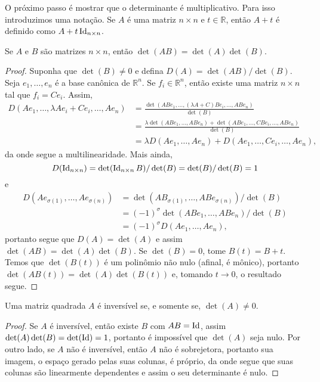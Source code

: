 O próximo passo é mostrar que o determinante é multiplicativo. Para isso introduzimos uma notação. Se $A$ é uma matriz $n \times n$ e $t \in \mathbb{R}$, então $A + t$ é definido como $A + t\operatorname{Id}_{n \times n}$.

\begin{theorem}
    Se $A$ e $B$ são matrizes $n \times n$, então $\det(AB) = \det(A)\det(B)$.
\end{theorem}
\begin{proof}
    Suponha que $\det(B) \neq 0$ e defina $D(A) = \det(AB)/\det(B)$. Seja $e_1, \dots, e_n$ é a base canônica de $\mathbb{R}^n$. Se $f_i \in \mathbb{R}^n$, então existe uma matriz $n \times n$ tal que $f_i = Ce_i$. Assim, \begin{align}
        D(Ae_1, \dots, \lambda Ae_i + Ce_i, \dots, Ae_n) &= \frac{\det(ABe_1, \dots, (\lambda A+C)Be_i, \dots, ABe_n)}{\det(B)} \\ &= \frac{\lambda \det(ABe_1, \dots, ABe_n) + \det(ABe_1, \dots, CBe_i, \dots, ABe_n)}{\det(B)} \\ &= \lambda D(Ae_1, \dots, Ae_n) + D(Ae_1, \dots, Ce_i, \dots, Ae_n),
    \end{align} da onde segue a multilinearidade. Mais ainda, \begin{equation}
        D(\operatorname{Id}_{n \times n}) = \det(\operatorname{Id}_{n \times n} B)/\det(B) = \det(B)/\det(B) = 1
    \end{equation} e \begin{align}
        D(Ae_{\sigma(1)}, \dots, Ae_{\sigma(n)}) &= \det(AB_{\sigma(1)}, \dots, ABe_{\sigma(n)})/\det(B) \\ &= (-1)^\sigma \det(ABe_1, \dots, ABe_n)/\det(B) \\ &= (-1)^\sigma D(Ae_1, \dots, Ae_n),
    \end{align} portanto segue que $D(A) = \det(A)$ e assim $\det(AB) = \det(A)\det(B)$. Se $\det(B) = 0$, tome $B(t) = B + t$. Temos que $\det(B(t))$ é um polinômio não nulo (afinal, é mônico), portanto $\det(AB(t)) = \det(A)\det(B(t))$ e, tomando $t \to 0$, o resultado segue.
\end{proof}

\begin{corollary}
    Uma matriz quadrada $A$ é inversível se, e somente se, $\det(A) \neq 0$.
\end{corollary}
\begin{proof}
    Se $A$ é inversível, então existe $B$ com $AB = \operatorname{Id}$, assim $\det(A) \det(B) = \det(\operatorname{Id}) = 1$, portanto é impossível que $\det(A)$ seja nulo. Por outro lado, se $A$ não é inversível, então $A$ não é sobrejetora, portanto sua imagem, o espaço gerado pelas suas colunas, é próprio, da onde segue que suas colunas são linearmente dependentes e assim o seu determinante é nulo.
\end{proof}


